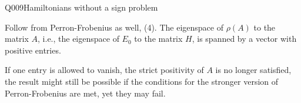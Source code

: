 \begin{entry}{Q009}{Hamiltonians without a sign problem}
\begin{solution}[Part (b)]
Follow from Perron-Frobenius as well, (4). The eigenspace of $\rho(A)$ to the matrix $A$, i.e., the eigenspace of $E_0$ to the matrix $H$, is spanned by a vector with positive entries.
\end{solution}

If one entry is allowed to vanish, the strict positivity of $A$ is no longer satisfied, the result might still be possible if the conditions for the stronger version of Perron-Frobenius are met, yet they may fail.


\end{entry}